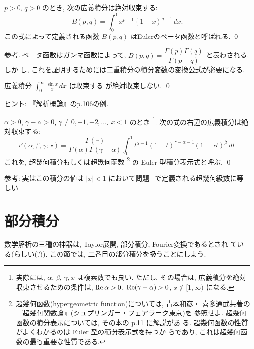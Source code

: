\documentclass[12pt,twoside]{jarticle}
\begin{document}
\begin{question}[ベータ函数]
  $p > 0$, $q > 0$ のとき, 次の広義積分は絶対収束する:
  \[
    B(p,q) = \int_0^1 x^{p-1} (1 - x)^{q-1} \,dx.
  \]
  この式によって定義される函数 $B(p,q)$ はEulerのベータ函数と呼ばれる.
  \qed
\end{question}

\noindent 参考: ベータ函数はガンマ函数によって, %
$B(p,q) = \dfrac{\Gamma(p)\Gamma(q)}{\Gamma(p+q)}$ と表わされる. しか
し, これを証明するためには二重積分の積分変数の変換公式が必要になる. 

\begin{question}
  広義積分 $\displaystyle \int_0^\infty\frac{\sin x}{x}\,dx$ は収束する
  が絶対収束しない. \qed
\end{question}

\noindent ヒント: 『解析概論』のp.106の例. 

\begin{question}[超幾何積分]\label{q:hypergeom-int}
  $\alpha > 0$, $\gamma-\alpha > 0$, %
  $\gamma \ne 0,-1,-2, \dots$, $x<1$ のとき%
  \footnote{実際には, $\alpha$, $\beta$, $\gamma, x$ は複素数でも良い.
    ただし, その場合は, 広義積分を絶対収束させるための条件は, %
    $\mathop{\mathrm{Re}}\nolimits\alpha > 0$, $\mathop{\mathrm{Re}}\nolimits(\gamma-\alpha) > 0$, %
    $x\notin[1,\infty)$ になる.}, %
  次の式の右辺の広義積分は絶対収束する:
  \[
    F(\alpha,\beta,\gamma; x)
    =
    \frac{\Gamma(\gamma)}{\Gamma(\alpha)\Gamma(\gamma-\alpha)}
    \int_0^1 t^{\alpha-1} (1 - t)^{\gamma-\alpha-1} (1 - xt)^\beta \,dt.
  \]%
  これを, 超幾何積分もしくは超幾何函数%
  \footnote{超幾何函数(hypergeometric function)については, 青本和彦・
    喜多通武共著の『超幾何関数論』(シュプリンガー・フェアラーク東京)を
    参照せよ. 超幾何函数の積分表示については, その本の p.11 に解説があ
    る. 超幾何函数の性質がよくわかるのは Euler 型の積分表示式を持つか
    らであり, これは超幾何函数の最も重要な性質である.}%
  の Euler 型積分表示式と呼ぶ.
  \qed
\end{question}

\noindent 参考: 実はこの積分の値は $|x|<1$ において問題 %
\ で定義される超幾何級数に等しい%


\section{部分積分}

数学解析の三種の神器は, Taylor展開, 部分積分, Fourier変換であるとされ
ている(らしい(?)). この節では, 二番目の部分積分を扱うことにしよう.
\end{document}
